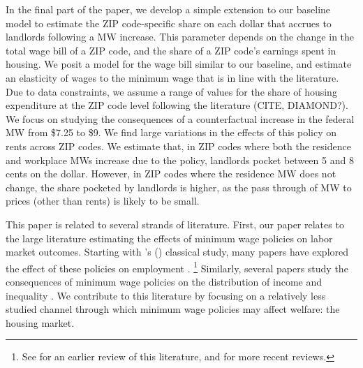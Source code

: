 
In the final part of the paper, we develop a simple extension to our baseline model
to estimate the ZIP code-specific share on each dollar that accrues to landlords
following a MW increase.
This parameter depends on the change in the total wage bill of a ZIP code, and the 
share of a ZIP code's earnings spent in housing.
We posit a model for the wage bill similar to our baseline, and estimate an elasticity
of wages to the minimum wage that is in line with the literature. %
Due to data constraints, we assume a range of values for the share of housing
expenditure at the ZIP code level following the literature (CITE, DIAMOND?).
We focus on studying the consequences of a counterfactual increase 
in the federal MW from \$7.25 to \$9.
We find large variations in the effects of this policy on rents across ZIP codes.
We estimate that, in ZIP codes where both the residence and workplace MWs increase
due to the policy, landlords pocket between 5 and 8 cents on the dollar.
However, in ZIP codes where the residence MW does not change, the share pocketed
by landlords is higher, as the pass through of MW to prices (other than rents)
is likely to be small.


This paper is related to several strands of literature.
First, our paper relates to the large literature estimating the effects of 
minimum wage policies on labor market outcomes.
Starting with \citeauthor{CardKrueger1994}'s (\citeyear{CardKrueger1994}) classical 
study, many papers have explored the effect of these policies on employment
\parencite[some recent examples include][]{MeerWest2016,CegnizEtAl2019}.%
\footnote{See \textcite{Neumark2006} for an earlier review of this literature,
and \textcite{Dube2019, NeumarkShirley2021} for more recent reviews.}
Similarly, several papers study the consequences of minimum wage policies on the 
distribution of income and inequality \parencite{Lee1999, AutorEtAl2016}.
We contribute to this literature by focusing on a relatively less studied channel
through which minimum wage policies may affect welfare: the housing market.

